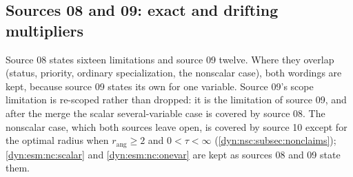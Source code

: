\documentclass[11pt,letterpaper]{article}
\theoremstyle{definition}
\theoremstyle{remark}
\newcommand{\rang}{r_{\mathrm{ang}}}
\numberwithin{equation}{section}
\begin{document}
\subsection{Sources 08 and 09: exact and drifting multipliers}
\label{dyn:esm:subsec:nonclaims}
Source 08 states sixteen limitations and source 09 twelve. Where they
overlap (status, priority, ordinary specialization, the nonscalar case),
both wordings are kept, because source 09 states its own for one variable.
Source 09's scope limitation is re-scoped rather than dropped: it is the
limitation of source 09, and after the merge the scalar several-variable case
is covered by source 08. The nonscalar case, which both sources leave open,
is covered by source 10 except for the optimal radius when $\rang\ge2$ and $0<\tau<\infty$
(\cref{dyn:nsc:subsec:nonclaims}); \ref{dyn:esm:nc:scalar} and
\ref{dyn:esm:nc:onevar} are kept as sources 08 and 09 state them.
\end{document}
